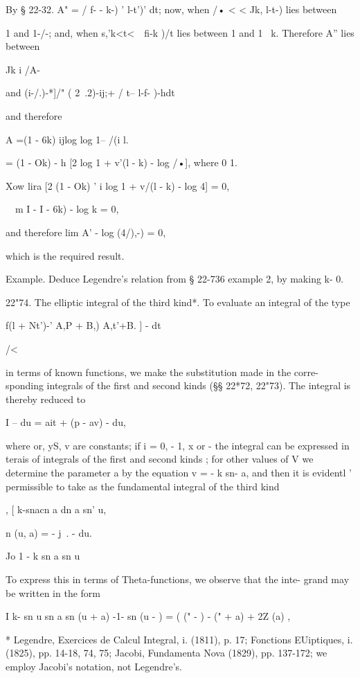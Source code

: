 By § 22-32. A" = / f- - k-) ' l-t')' dt; now, when /• < < Jk, l-t-)
lies between

1 and 1-/-; and, when s,'k<t<\ \ fi-k )/t lies between 1 and 1 ~k.
Therefore A'' lies between

Jk i /A-

and (i-/.)-*]/" ( 2\ .2)-ij;+ / t-- l-f- )-hdt\;

and therefore

A =(1 - 6k) ijlog log 1-- /(i l.

= (1 - Ok) - h [2 log 1 + v'(l - k) - log /•], where 0 1.

Xow lira [2 (1 - Ok) ' i log 1 + v/(l - k) - log 4] = 0,

\ \ m I - I - 6k) - log k = 0,

and therefore lim A' - log (4/),-) = 0,

which is the required result.

Example. Deduce Legendre's relation from § 22-736 example 2, by making
k- 0.

22"74. The elliptic integral of the third kind*. To evaluate an
integral of the type

f(l + Nt')-' A,P + B,) A,t'+B. ] - dt

/<

in terms of known functions, we make the substitution made in the
corre- sponding integrals of the first and second kinds (§§ 22*72,
22"73). The integral is thereby reduced to

I -- du = ait + (p - av) - du,

where or, yS, v are constants; if i = 0, - 1, x or - the integral
can be expressed in terais of integrals of the first and second kinds
; for other values of V we determine the parameter a by the equation v
= - k sn- a, and then it is evidentl ' permissible to take as the
fundamental integral of the third kind

, [ k-snacn a dn a sn' u,

n (u, a) = - j~. - du.

  Jo 1 - k sn a sn u

To express this in terms of Theta-functions, we observe that the inte-
grand may be written in the form

I k- sn u sn a sn (u + a) -1- sn (u - ) = ( (" - ) - (" + a) + 2Z (a)
,

* Legendre, Exercices de Calcul Integral, i. (1811), p. 17; Fonctions
EUiptiques, i. (1825), pp. 14-18, 74, 75; Jacobi, Fundamenta Nova
(1829), pp. 137-172; we employ Jacobi's notation, not Legendre's.

